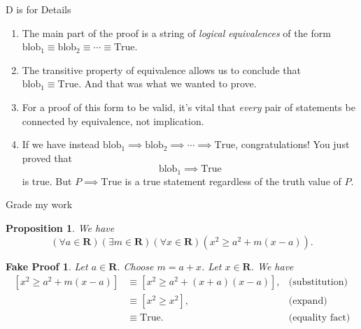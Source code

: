 \documentclass[usenames,dvipsnames,fleqn,leqno,10pt, pdflatex]{beamer}
\newcommand{\reals}{\mathbf{R}}
\newenvironment{PenList}{
  \begin{enumerate}[\textcolor{UNK-blue}{\PencilRightDown}]
    \addtolength{\itemsep}{-0.0\itemsep}}
  {\end{enumerate}}
\newtheorem{myprop}{Proposition}
\newtheorem{fakeproof}{Fake Proof}
\begin{document}
\begin{frame}{D is for Details}

\begin{PenList}
\item The main part of the proof is  a string of \emph{logical equivalences} of the form $\mbox{blob}_1 \equiv \mbox{blob}_2 \equiv \cdots 
\equiv \mbox{True}$.

\item The transitive property  of equivalence allows us to conclude that $\mbox{blob}_1 \equiv \mbox{True}$. And that was what we wanted to prove.

\item For a proof of this form to be valid, it's vital that \emph{every} pair of statements be connected by equivalence, not implication. 

\item If we have instead $\mbox{blob}_1 \implies \mbox{blob}_2 \implies  \cdots \implies \mbox{True}$, congratulations! You just proved that
\begin{equation*}
   \mbox{blob}_1   \implies  \mbox{True}
\end{equation*}
is true.  But $ P \implies \mbox{True}$ is a true statement regardless of the truth value of $P$.  


\end{PenList}
\end{frame}
\begin{frame}{Grade my work}

\begin{myprop} We have
$$
\left(\forall a \in \reals\right)\left(\exists m \in \reals\right)\left (\forall x \in \reals \right) \left(x^2 \geq a^2 + m (x-a) \right).
$$
\end{myprop}

\begin{fakeproof}Let $a \in \reals$. Choose $m = a+x$. Let $x \in \reals$. We have
\begin{align*}
    \left[x^2 \geq a^2 + m (x -a) \right] &\equiv \left[x^2 \geq a^2 + (x+a)  (x -a) \right],
       &\mbox{(substitution)}\\
       &\equiv \left[x^2 \geq x^2 \right], &\mbox{(expand)}\\
       &\equiv \mbox{True}.   &\mbox{(equality fact)}\\
\end{align*}
\end{fakeproof}

\end{frame}
    
\end{document}
